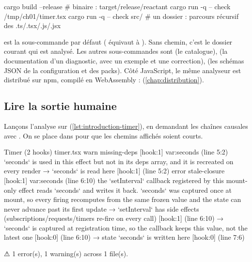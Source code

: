 \begin{shell}
cargo build --release          # binaire : target/release/reactant
cargo run -q -- check /tmp/ch01/timer.tsx
cargo run -q -- check src/     # un dossier : parcours récursif des .ts/.tsx/.js/.jsx
\end{shell}

 est la sous-commande par défaut ( équivaut à
). Sans chemin, c'est le dossier courant qui est
analysé. Les autres sous-commandes sont  (le catalogue),
 (la documentation d'un diagnostic, avec un exemple et
une correction),  (les schémas JSON de la configuration et des
packs). Côté JavaScript, le même analyseur est distribué sur npm, compilé en
WebAssembly :  (\cref{chap:distribution}).

\subsection{Lire la sortie humaine}

Lançons l'analyse sur  (\cref{lst:introduction-timer}), en
demandant les chaînes causales avec . On se place dans
 pour que les chemins affichés soient courts.

\begin{sortie}
  Timer  (2 hooks)  timer.tsx
    warn   missing-deps  [hook:1]  var:seconds  (line 5:2)  `seconds` is used in this effect but not in its deps array, and it is recreated on every render
       → `seconds` is read here [hook:1] (line 5:2)
    error  stale-closure  [hook:1]  var:seconds  (line 6:10)  the `setInterval` callback registered by this mount-only effect reads `seconds` and writes it back. `seconds` was captured once at mount, so every firing recomputes from the same frozen value and the state can never advance past its first update
       → `setInterval` has side effects (subscriptions/requests/timers re-fire on every call) [hook:1] (line 6:10)
       → `seconds` is captured at registration time, so the callback keeps this value, not the latest one [hook:0] (line 6:10)
       → state `seconds` is written here [hook:0] (line 7:6)

⚠  1 error(s), 1 warning(s) across 1 file(s).
\end{sortie}

